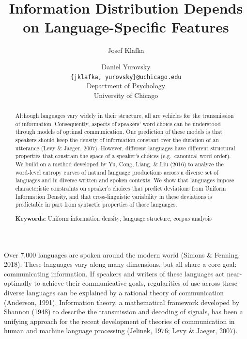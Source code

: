 \documentclass[10pt, letterpaper]{article}
\title{Information Distribution Depends on Language-Specific Features}
\author{Josef Klafka \and Daniel Yurovsky \\
        \texttt{\{jklafka, yurovsky\}@uchicago.edu} \\
       Department of Psychology \\ University of Chicago}
\begin{document}
\maketitle

\begin{abstract}
Although languages vary widely in their structure, all are vehicles for
the transmission of information. Consequently, aspects of speakers' word
choice can be understood through models of optimal communication. One
prediction of these models is that speakers should keep the density of
information constant over the duration of an utterance (Levy \& Jaeger,
2007). However, different languages have different structural properties
that constrain the space of a speaker's choices (e.g.~canonical word
order). We build on a method developed by Yu, Cong, Liang, \& Liu (2016)
to analyze the word-level entropy curves of natural language productions
across a diverse set of languages and in diverse written and spoken
contexts. We show that languages impose characteristic constraints on
speaker's choices that predict deviations from Uniform Information
Density, and that cross-linguistic variability in these deviations is
predictable in part from syntactic properties of those languages.

\textbf{Keywords:}
Uniform information density; language structure; corpus analysis
\end{abstract}

Over 7,000 languages are spoken around the modern world (Simons \&
Fenning, 2018). These languages vary along many dimensions, but all
share a core goal: communicating information. If speakers and writers of
these languages act near-optimally to achieve their communicative goals,
regularities of use across these diverse languages can be explained by a
rational theory of communication (Anderson, 1991). Information theory, a
mathematical framework developed by Shannon (1948) to describe the
transmission and decoding of signals, has been a unifying approach for
the recent development of theories of communication in human and machine
language processing (Jelinek, 1976; Levy \& Jaeger, 2007).
\end{document}
